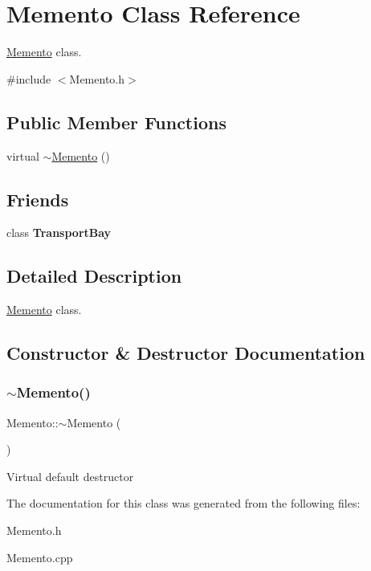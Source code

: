 \hypertarget{classMemento}{}\section{Memento Class Reference}
\label{classMemento}


\hyperlink{classMemento}{Memento} class.  




{\ttfamily \#include $<$Memento.\+h$>$}

\subsection*{Public Member Functions}
\begin{DoxyCompactItemize}
\item 
virtual \hyperlink{classMemento_af680b5488989567d0f03d655c4232924}{$\sim$\+Memento} ()
\end{DoxyCompactItemize}
\subsection*{Friends}
\begin{DoxyCompactItemize}
\item 
\mbox{\label{classMemento_a35831582729e6f468d0640f39619f09e}} 
class {\bfseries Transport\+Bay}
\end{DoxyCompactItemize}


\subsection{Detailed Description}
\hyperlink{classMemento}{Memento} class. 

\subsection{Constructor \& Destructor Documentation}
\mbox{\label{classMemento_af680b5488989567d0f03d655c4232924}} 
\subsubsection{\texorpdfstring{$\sim$\+Memento()}{~Memento()}}
{\footnotesize\ttfamily Memento\+::$\sim$\+Memento (\begin{DoxyParamCaption}{ }\end{DoxyParamCaption})\hspace{0.3cm}{\ttfamily [virtual]}}

Virtual default destructor 

The documentation for this class was generated from the following files\+:\begin{DoxyCompactItemize}
\item 
Memento.\+h\item 
Memento.\+cpp\end{DoxyCompactItemize}
